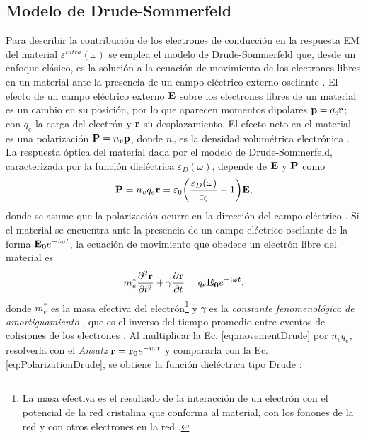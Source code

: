 \subsection{Modelo de Drude-Sommerfeld}
\label{ssection:Drude}

 Para describir la contribución de los electrones de conducción en la respuesta EM del material $\varepsilon^{intra}(\omega)$ se emplea el modelo de Drude-Sommerfeld que, desde un enfoque clásico, es la solución a la ecuación de movimiento de los electrones libres en un material ante la presencia de un campo eléctrico externo oscilante \cite{gross2014festkorperphysik}. El efecto de un campo eléctrico externo $\vb{E}$ sobre los electrones libres de un material es un cambio en su posición, por lo que aparecen momentos dipolares $\vb{p}=q_e\vb{r}$; con $q_e$ la carga del electrón y $\vb{r}$ su desplazamiento.  El efecto neto en el material es una polarización $\vb{P} = n_v \vb{p}$, donde $n_v$ es la densidad volumétrica electrónica \cite{novotny2006principles}.  La respuesta óptica del material dada por el modelo de Drude-Sommerfeld, caracterizada por la función dieléctrica $\varepsilon_D(\omega)$, depende de $\vb{E}$ y $\vb{P}$ como 
%
	\begin{align}
	\vb{P} = n_v q_e \vb{r} =\varepsilon_0\qty(\frac{\varepsilon_D(\omega)}{\varepsilon_0}-1)\vb{E},
	\label{eq:PolarizationDrude}
	\end{align}
%
donde se asume que la polarización ocurre en la dirección del campo eléctrico \cite{novotny2006principles}. Si el material se encuentra ante la presencia de un campo eléctrico oscilante de la forma $\vb{E_0} e^{-i\omega t}$, la ecuación de movimiento que obedece un electrón libre del material es \cite{kreibig1995clusters,gross2014festkorperphysik}
%
	\begin{align}
	m_e^* \pdv[2]{\vb{r}}{t} +  \gamma \pdv{\vb{r}}{t} = q_e\vb{E_0}e^{-i\omega t},
	\label{eq:movementDrude}
	\end{align}
%
donde $m_e^*$ es la masa efectiva del electrón\footnote{La masa efectiva es el resultado de la interacción de un electrón con el potencial de la red cristalina que conforma al material, con los fonones de la red y con otros electrones en la red \cite{gross2014festkorperphysik}. } \cite{gross2014festkorperphysik} y $\gamma$ es la \emph{constante fenomenológica de amortiguamiento} \cite{kreibig1995clusters}, que es el inverso del tiempo promedio entre eventos de colisiones  de los electrones \cite{novotny2006principles,gross2014festkorperphysik}.  Al multiplicar la Ec.  \eqref{eq:movementDrude} por $n_v q_e$, resolverla con el \emph{Ansatz} $\vb{r} = \vb{r_0}e^{-i\omega t}$ y compararla con la Ec.  \eqref{eq:PolarizationDrude}, se obtiene la función dieléctrica tipo Drude \cite{novotny2006principles,gross2014festkorperphysik}:  \vspace*{-.75em}
